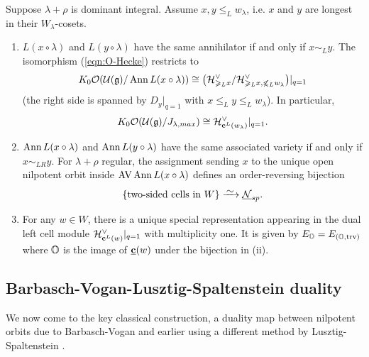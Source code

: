 \documentclass[reqno]{amsart}
\newcommand{\ubar}[1]{\underline{#1}}
\DeclareMathOperator{\AV}{AV}
\DeclareMathOperator{\trv}{trv}
\begin{document}
\begin{theorem}\label{thm:O(J)}
	Suppose $\lambda+ \rho$ is dominant integral. Assume $x,y \le_L w_\lambda$, i.e. $x$ and $y$ are longest in their $W_\lambda$-cosets.
	\begin{enumerate}[label=(\roman*)]
		\item $L(x \circ \lambda)$ and $L(y \circ \lambda)$ have the same annihilator if and only if $x \sim_L y$. The isomorphism (\ref{eqn:O-Hecke}) restricts to
		\begin{equation*}
			K_0 \mathcal{O}(\mathcal{U}(\mathfrak{g})/ \operatorname{Ann} L(x \circ \lambda)) \cong \big( \mathcal{H}_{\geqslant_L x}^\vee / \mathcal{H}_{\geqslant_L x, \not\leqslant_L w_\lambda}^\vee \big)|_{q=1}
		\end{equation*}
		(the right side is spanned by $D_y|_{q=1}$ with $x \le_L y \le_L w_\lambda$). In particular,
		\begin{equation*}
			K_0 \mathcal{O}(\mathcal{U}(\mathfrak{g})/J_{\lambda,max}) \cong \mathcal{H}_{\mathbf{c}^L(w_\lambda)}^\vee|_{q=1}.
		\end{equation*}
		
		\item $\operatorname{Ann} L(x \circ \lambda)$ and $\operatorname{Ann} L(y \circ \lambda)$ have the same associated variety if and only if $x \sim_{LR} y$. For $\lambda+\rho$ regular, the assignment sending $x$ to the unique open nilpotent orbit inside $\AV \Ann L(x \circ \lambda)$ defines an order-reversing bijection
		\begin{equation*}
			\{\text{two-sided cells in } W\} \bijects \ubar \cN_{sp}.
		\end{equation*}
		
		\item For any $w \in W$, there is a unique special representation appearing in the dual left cell module $\mathcal{H}_{\mathbf{c}^L(w)}^\vee|_{q=1}$ with multiplicity one. It is given by $E_\BO = E_{(\BO,\trv)}$ where $\mathbb{O}$ is the image of $\ubar \bc(w)$ under the bijection in (ii).
	\end{enumerate}
\end{theorem}


\subsection{Barbasch-Vogan-Lusztig-Spaltenstein duality}\label{subsec:BV-dual}

We now come to the key classical construction, a duality map between nilpotent orbits due to Barbasch-Vogan \cite{Barbasch-Vogan:unipotent} and earlier using a different method by Lusztig-Spaltenstein \cite{Lusztig:sp-1}.
\end{document}
